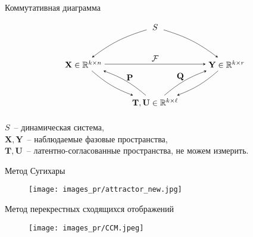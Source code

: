 \documentclass[9pt]{beamer}
\newcommand{\bY}{\mathbf{Y}}
\newcommand{\bX}{\mathbf{X}}
\newcommand{\bP}{\mathbf{P}}
\newcommand{\bT}{\mathbf{T}}
\newcommand{\bQ}{\mathbf{Q}}
\newcommand{\bU}{\mathbf{U}}
\newcommand{\bbR}{\mathbb{R}}
\begin{document}
\begin{frame}{Коммутативная диаграмма}
    \[
        \begin{tikzpicture}
			\matrix (m) [matrix of math nodes,row sep=3em,column sep=3em,minimum width=2em,ampersand replacement=\&]
			{
			    \& S \&
			    \\
				\mathbf{X}\in\bbR^{k\times n} \& \& \mathbf{Y}\in\bbR^{k\times r} \\
				\& \mathbf{T}, \mathbf{U} \in \bbR^{k\times\ell} \& \\};
			\path[-stealth]
			(m-1-2) edge [bend right=10] node {} (m-2-1)
			(m-1-2) edge [bend left=10] node {} (m-2-3)
			(m-2-1) edge node [above] {$\mathcal{F}$} (m-2-3)
			(m-2-1) edge [bend right=10] node [below, pos=0.4] {} (m-3-2)
			(m-3-2) edge [bend right=10] node [above, pos=0.4] {$\bP$} (m-2-1)
			(m-2-3) edge [bend left=10] node [below, pos=0.4] {} (m-3-2)
			(m-3-2) edge [bend left=10] node [above, pos=0.4] {$\bQ$} (m-2-3);
		\end{tikzpicture}
    \]
    
    \vspace{0.2cm}
    
    $S$~-- динамическая система,\\
    $\bX, \bY$~-- наблюдаемые фазовые пространства,\\
    $\bT,\bU$~-- латентно-согласованные пространства, не можем измерить.
\end{frame}
\begin{frame}{Метод Сугихары}
\begin{figure}[h]
\centering
\texttt{[image: images\_pr/attractor\_new.jpg]}
\end{figure}
\end{frame}
\begin{frame}{Метод перекрестных сходящихся отображений}
\begin{figure}[h]
\centering
\texttt{[image: images\_pr/CCM.jpeg]}
\end{figure}
\end{frame}
\end{document}
